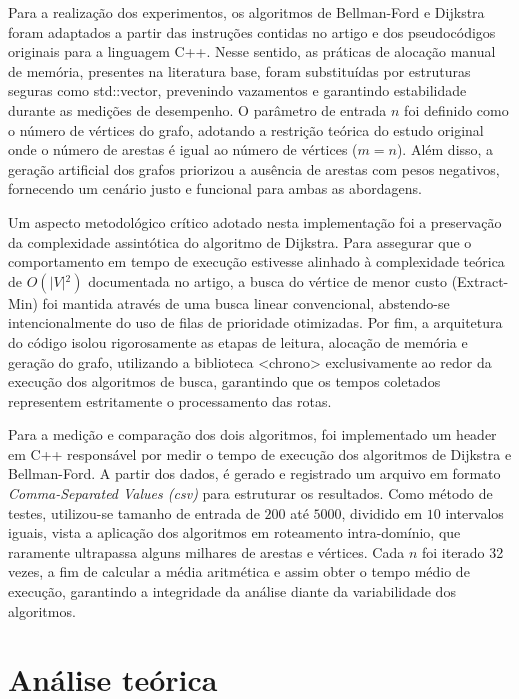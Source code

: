 \documentclass[12pt]{article}
\begin{document}
Para a realização dos experimentos, os algoritmos de Bellman-Ford e 
Dijkstra foram adaptados a partir das instruções contidas no artigo e 
dos pseudocódigos originais para a linguagem C++. Nesse sentido, as práticas de 
alocação manual de memória, presentes na literatura base, foram
substituídas por estruturas seguras como std::vector, prevenindo 
vazamentos e garantindo estabilidade durante as medições de desempenho. 
O parâmetro de entrada $n$ foi definido como o número de vértices do grafo, 
adotando a restrição teórica do estudo original onde o número de arestas é 
igual ao número de vértices ($m = n$). Além disso, a geração artificial dos 
grafos priorizou a ausência de arestas com pesos negativos, fornecendo um 
cenário justo e funcional para ambas as abordagens.

Um aspecto metodológico crítico adotado nesta implementação foi a 
preservação da complexidade assintótica do algoritmo de Dijkstra.
Para assegurar que o comportamento em tempo de execução estivesse alinhado à 
complexidade teórica de $O(\vert{}V\vert{}^2)$ documentada no artigo, 
a busca do vértice de menor custo (Extract-Min) foi mantida através 
de uma busca linear convencional, abstendo-se intencionalmente 
do uso de filas de prioridade otimizadas. Por fim, a arquitetura do 
código isolou rigorosamente as etapas de leitura, alocação de memória 
e geração do grafo, utilizando a biblioteca <chrono> exclusivamente 
ao redor da execução dos algoritmos de busca, garantindo que os 
tempos coletados representem estritamente o processamento das rotas.

Para a medição e comparação dos dois algoritmos, foi implementado um
header em C++ responsável por medir o tempo de execução dos
algoritmos de Dijkstra e  Bellman-Ford. A partir dos dados, é gerado
e registrado um arquivo em formato \textit{Comma-Separated Values
(csv)} para estruturar os resultados. Como método de testes,
utilizou-se tamanho de entrada de $200$ até $5000$, dividido em $10$
intervalos iguais, vista a aplicação dos algoritmos em roteamento
intra-domínio, que raramente ultrapassa alguns milhares de arestas e
vértices. Cada $n$ foi iterado 32 vezes, a fim de calcular a média
aritmética e assim obter o tempo médio de execução, garantindo a
integridade da análise diante da variabilidade dos algoritmos.

\section{Análise teórica} \label{sec:analise_teorica}
\end{document}
